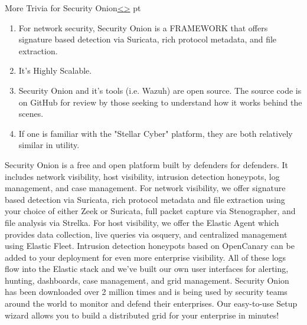 \documentclass[12pt]{article}
\newenvironment{instructionblock}{\Large\bgroup}{\egroup}
\newcommand{\ben}{\begin{enumerate}}
\newcommand{\een}{\end{enumerate}}
\begin{document}



\pagebreak


\pagebreak
\begin{slide}{More Trivia for Security Onion}{\hyperref[slide 2]{\textless}\hyperref[slide 4]{\textgreater}}
	 pt
	\begin{instructionblock}
		\ben
			\item 	For network security, Security Onion is a FRAMEWORK that offers signature based detection via Suricata, rich protocol metadata, and file extraction.
			\item 	It's Highly Scalable.
			\item   Security Onion and it's tools (i.e. Wazuh) are open source. The source code is on GitHub for review by those seeking to understand how it works behind the scenes.
            \item   If one is familiar with the "Stellar Cyber" platform, they are both relatively similar in utility.
	\een
	\end{instructionblock}
\end{slide}

\vfill 


Security Onion is a free and open platform built by defenders for defenders. It includes network visibility, host visibility, intrusion detection honeypots, log management, and case management.
For network visibility, we offer signature based detection via Suricata, rich protocol metadata and file extraction using your choice of either Zeek or Suricata, full packet capture via Stenographer, and file analysis via Strelka. For host visibility, we offer the Elastic Agent which provides data collection, live queries via osquery, and centralized management using Elastic Fleet. Intrusion detection honeypots based on OpenCanary can be added to your deployment for even more enterprise visibility. All of these logs flow into the Elastic stack and we've built our own user interfaces for alerting, hunting, dashboards, case management, and grid management.
Security Onion has been downloaded over 2 million times and is being used by security teams around the world to monitor and defend their enterprises. Our easy-to-use Setup wizard allows you to build a distributed grid for your enterprise in minutes!
\end{document}
